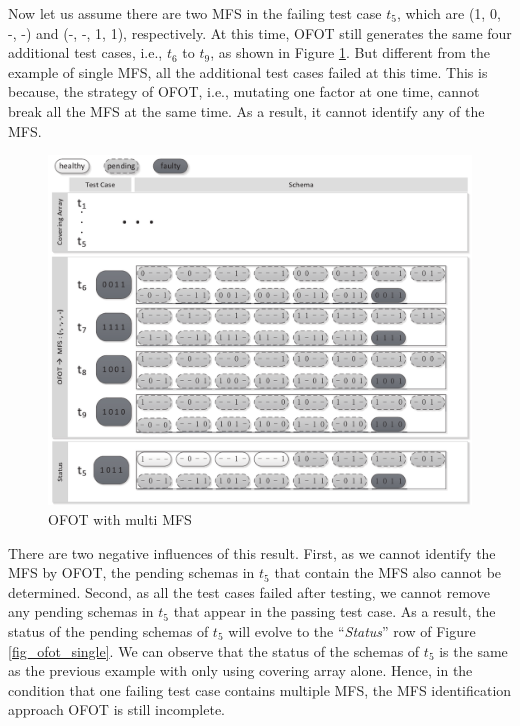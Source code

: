 Now let us assume there are two MFS in the failing test case $t_{5}$, which are (1, 0, -, -) and (-, -, 1, 1), respectively. At this time, OFOT still generates the same four additional test cases, i.e., $t_{6}$ to $t_{9}$,  as shown in Figure \ref{fig_ofot_multi}. But different from the example of single MFS,  all the additional test cases failed at this time. This is because, the strategy of OFOT, i.e., mutating one factor at one time, cannot break all the MFS at the same time. As a result, it cannot identify any of the MFS.
\begin{figure}[ht]
 \centering
 \includegraphics[width=5.6in]{ofot_multi.pdf}
 \caption{OFOT with multi MFS}
 \label{fig_ofot_multi}
\end{figure}

There are two negative influences of this result. First, as we cannot identify the MFS by OFOT, the pending schemas in $t_{5}$ that contain the MFS also cannot be determined. Second, as all the test cases failed after testing, we cannot remove any pending schemas in $t_{5}$ that appear in the passing test case. As a result, the status of the pending schemas of $t_{5}$ will evolve to the ``\emph{Status}'' row of Figure \ref{fig_ofot_single}. We can observe that the status of the schemas of $t_{5}$ is the same as the previous example with only using covering array alone. Hence, in the condition that one failing test case contains multiple MFS, the MFS identification approach OFOT is still incomplete.



